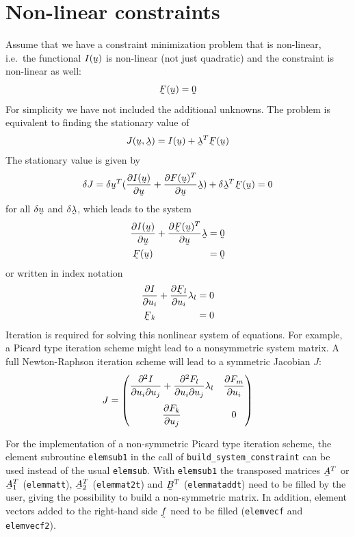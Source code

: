 \section{Non-linear constraints}
\label{sec:nonlinearconstraint}
Assume that we have a constraint minimization problem that is non-linear, i.e.\
the functional $I(\col u)$ is non-linear (not just quadratic) and the
constraint is non-linear as well:
\begin{equation}
   \col F(\col u) = \col 0
\end{equation}
For simplicity we have not included the additional unknowns.
The problem is equivalent to finding the stationary value of
\[
   J(\col u,\col\lambda)= I(\col u) +
    \col\lambda^T \col F(\col u )
\]
The stationary value is given by
\begin{equation}
   \delta {J} = \delta \col u^T(\pderiv{I(\col u)}{\col u}+
                                \pderiv{F(\col u)^T}{\col u}\col\lambda)+
                              \delta \col\lambda^T \col F(\col u ) = 0
\end{equation}
for all $\delta \col u$ and $\delta\col\lambda$, which leads to the system
\begin{align}
\pderiv{I(\col u)}{\col u}+
                 \pderiv{\col F(\col u)^T}{\col u}\col\lambda&=\col 0\\
\col F(\col u )\hspace*{2cm} & = \col 0
\end{align}
or written in index notation
\begin{align}
\pderiv{I}{u_i}+
                 \pderiv{\col F_l}{u_i}\lambda_l&= 0\\
\col F_k\hspace*{1.5cm} & = 0
\end{align}
Iteration is required for solving this nonlinear system of equations. For
example, a Picard type iteration scheme might lead to a nonsymmetric system
matrix. A full Newton-Raphson iteration scheme will lead to a symmetric Jacobian
$J$:
\begin{equation}
   J=\begin{pmatrix}
      \dfrac{\partial ^2I}{\partial u_i \partial u_j}+\dfrac{\partial ^2F_l}{\partial u_i \partial u_j}\lambda_l &
   \dfrac{\partial F_m}{\partial u_i} \\[3ex]
   \dfrac{\partial F_k}{\partial u_j} & 0
   \end{pmatrix}
\end{equation}

For the implementation of a non-symmetric Picard type iteration scheme, the 
element subroutine \texttt{elemsub1} in the call of
\texttt{build\_system\_constraint} can be used instead of the usual 
\texttt{elemsub}. With \texttt{elemsub1} the transposed matrices 
$\mat A^T$ or $\mat A_1^T$ (\texttt{elemmatt}), 
$\mat A_2^T$ (\texttt{elemmat2t}) and
$\mat B^T$ (\texttt{elemmataddt}) need to be filled by the user, giving the
possibility to build a non-symmetric matrix. In addition, element vectors added
to the right-hand side $\col f$ need to be filled (\texttt{elemvecf} and
\texttt{elemvecf2}).

